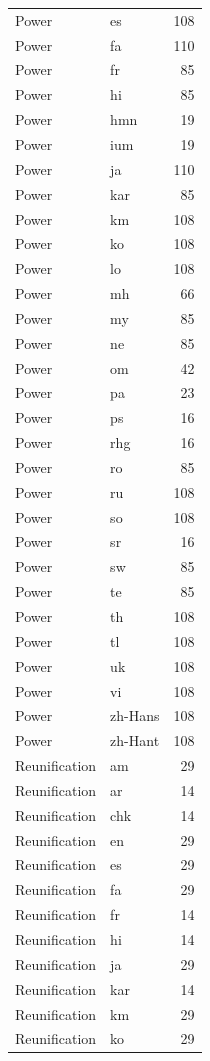 \begin{longtable}{p{3cm} p{3cm} r}
Power & es & 108 \\
Power & fa & 110 \\
Power & fr & 85 \\
Power & hi & 85 \\
Power & hmn & 19 \\
Power & ium & 19 \\
Power & ja & 110 \\
Power & kar & 85 \\
Power & km & 108 \\
Power & ko & 108 \\
Power & lo & 108 \\
Power & mh & 66 \\
Power & my & 85 \\
Power & ne & 85 \\
Power & om & 42 \\
Power & pa & 23 \\
Power & ps & 16 \\
Power & rhg & 16 \\
Power & ro & 85 \\
Power & ru & 108 \\
Power & so & 108 \\
Power & sr & 16 \\
Power & sw & 85 \\
Power & te & 85 \\
Power & th & 108 \\
Power & tl & 108 \\
Power & uk & 108 \\
Power & vi & 108 \\
Power & zh-Hans & 108 \\
Power & zh-Hant & 108 \\
Reunification & am & 29 \\
Reunification & ar & 14 \\
Reunification & chk & 14 \\
Reunification & en & 29 \\
Reunification & es & 29 \\
Reunification & fa & 29 \\
Reunification & fr & 14 \\
Reunification & hi & 14 \\
Reunification & ja & 29 \\
Reunification & kar & 14 \\
Reunification & km & 29 \\
Reunification & ko & 29 \\

\end{longtable}
